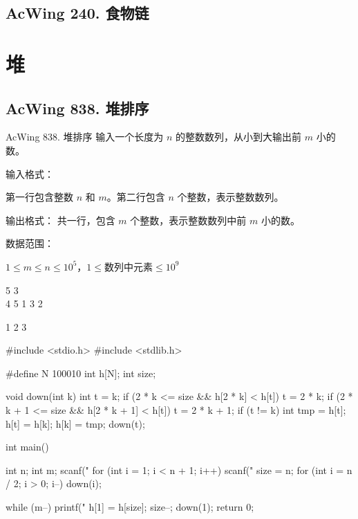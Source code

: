 \subsection{AcWing 240. 食物链}

\section{堆}
\subsection{AcWing 838. 堆排序}

\begin{titledbox}{AcWing 838. 堆排序}
输入一个长度为 $n$ 的整数数列，从小到大输出前 $m$ 小的数。

输入格式：

第一行包含整数 $n$ 和 $m$。第二行包含 $n$ 个整数，表示整数数列。

输出格式：
共一行，包含 $m$ 个整数，表示整数数列中前 $m$ 小的数。

数据范围：

$1 \le m \le n \le 10^5$，$1 \le 数列中元素 \le 10^9$

\begin{inputblock}
    5 3 \\
    4 5 1 3 2
\end{inputblock}
\begin{outputblock}
    1 2 3
\end{outputblock}
        
\end{titledbox}

\begin{mycpptwocol}[堆排序]
#include <stdio.h>
#include <stdlib.h>

#define N 100010
int h[N];
int size;

void down(int k)
{
    int t = k;
    if (2 * k <= size && h[2 * k] < h[t]) {
        t = 2 * k;
    }
    if (2 * k + 1 <= size && h[2 * k + 1] < h[t]) {
        t = 2 * k + 1;
    }
    if (t != k) {
        int tmp = h[t];
        h[t] = h[k];
        h[k] = tmp;
        down(t);
    }
}

int main()
{
    int n;
    int m;
    scanf("%
    for (int i = 1; i < n + 1; i++) {
        scanf("%
    }
    size = n;
    for (int i = n / 2; i > 0; i--) {
        down(i);
    }
    
    while (m--) {
        printf("%
        h[1] = h[size];
        size--;
        down(1);
    }
    return 0;
}
\end{mycpptwocol}

